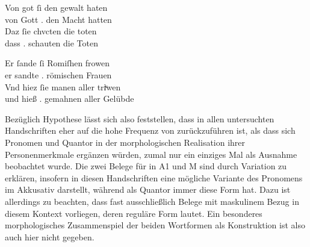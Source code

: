 \begin{exe}
\ex \label{ex:vbsisie}
 	\begin{xlist}
 	\ex \gll Von got ſi den gewalt haten \\
		     von Gott \Tpl\subM.\Nom{} den Macht hatten \\
 	\sn \gll Daz ſie chvcten die toten \\
		     dass \Tpl\subM.\Nom{} schauten die Toten \\
		\begin{taggedline}{\parencites[\pno~42ra,38--39]{kc:VB}[vgl.][8664--8665]{schroeder1895}}
		\trans {}
		\end{taggedline}
 		\label{ex:vbsisie_1}

	\ex \gll Er ſande ſi Romiſhen frowen \\
		     er sandte \Tpl\subI.\Acc{} römischen Frauen \\
	\sn \gll Vnd hiez ſie manen aller triͮwen \\
		     und hieß \Tpl\subF.\Acc{} gemahnen aller Gelübde \\
		\begin{taggedline}{\parencites[\pno~50va,5--6]{kc:VB}[vgl.][10467--10468]{schroeder1895}}
		\trans {}
		\end{taggedline}
		\label{ex:vbsisie_2}
	\end{xlist}
\end{exe}

Bezüglich  Hypothese lässt sich also feststellen, dass
 in allen unter\-suchten Handschriften eher auf die hohe Frequenz
von  zurückzuführen ist, als dass sich Pro\-nomen und Quantor in der
morphologischen Realisation ihrer Personenmerkmale ergänzen würden, zumal
 nur ein einziges Mal als Ausnahme beobachtet wurde. Die zwei
Belege für  in A1 und M sind durch
Variation zu erklären, insofern  in diesen Handschriften eine
mög\-liche Variante des Pronomens im Akkusativ darstellt, während 
als Quantor immer diese Form hat. Dazu ist allerdings zu beachten, dass fast
ausschließlich Belege mit maskulinem Bezug in diesem Kontext vorliegen, deren
reguläre Form  lautet. Ein besonderes morphologisches Zusammenspiel
der beiden Wortformen als Konstruktion ist also auch hier nicht gegeben.

